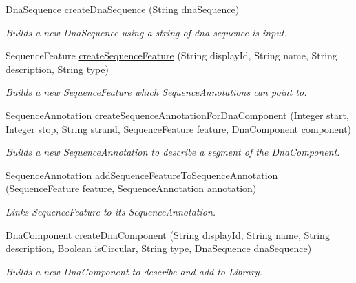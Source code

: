 \begin{DoxyCompactItemize}
\item 
DnaSequence \hyperlink{classorg_1_1sbolstandard_1_1rdf_1_1_sbol_service_a61e2cda6134ecedb3a5d0b92206b91a2}{createDnaSequence} (String dnaSequence)
\begin{DoxyCompactList}\small\item\em Builds a new DnaSequence using a string of dna sequence is input. \item\end{DoxyCompactList}\item 
SequenceFeature \hyperlink{classorg_1_1sbolstandard_1_1rdf_1_1_sbol_service_a5dab616a55f915c1ebaa6b244fb48fb5}{createSequenceFeature} (String displayId, String name, String description, String type)
\begin{DoxyCompactList}\small\item\em Builds a new SequenceFeature which SequenceAnnotations can point to. \item\end{DoxyCompactList}\item 
SequenceAnnotation \hyperlink{classorg_1_1sbolstandard_1_1rdf_1_1_sbol_service_a356289e398e1fe3a192b8c1ef74e0a4c}{createSequenceAnnotationForDnaComponent} (Integer start, Integer stop, String strand, SequenceFeature feature, DnaComponent component)
\begin{DoxyCompactList}\small\item\em Builds a new SequenceAnnotation to describe a segment of the DnaComponent. \item\end{DoxyCompactList}\item 
SequenceAnnotation \hyperlink{classorg_1_1sbolstandard_1_1rdf_1_1_sbol_service_a4dbd0885b3977f121439873805a294ba}{addSequenceFeatureToSequenceAnnotation} (SequenceFeature feature, SequenceAnnotation annotation)
\begin{DoxyCompactList}\small\item\em Links SequenceFeature to its SequenceAnnotation. \item\end{DoxyCompactList}\item 
DnaComponent \hyperlink{classorg_1_1sbolstandard_1_1rdf_1_1_sbol_service_ad3946d924f4c43fa442841aa5d56d474}{createDnaComponent} (String displayId, String name, String description, Boolean isCircular, String type, DnaSequence dnaSequence)
\begin{DoxyCompactList}\small\item\em Builds a new DnaComponent to describe and add to Library. \item\end{DoxyCompactList}\item 

\end{DoxyCompactItemize}
